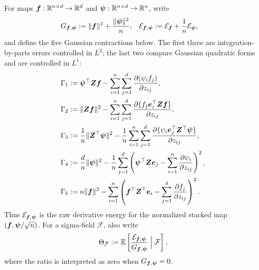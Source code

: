 \documentclass{article}
\theoremstyle{plain} %
\theoremstyle{definition} %
\theoremstyle{definition} %
\begin{document}
For maps $\boldsymbol{f}:{\mathbb{R}}^{n\times d}\to{\mathbb{R}}^d$ and
$\boldsymbol\psi:{\mathbb{R}}^{n\times d}\to{\mathbb{R}}^n$, write
\begin{align*}
    G_{\boldsymbol{f},\boldsymbol\psi}
    &:=\lVert\boldsymbol{f}\rVert^2+\frac{\lVert\boldsymbol\psi\rVert^2}{n},
    &
    {\mathcal E}_{\boldsymbol{f},\boldsymbol\psi}
    &:={\mathcal E}_{\boldsymbol{f}}+\frac1n{\mathcal E}_{\boldsymbol\psi},
\end{align*}
and define the five Gaussian contractions below. The first three are
integration-by-parts errors controlled in $L^2$; the last two compare
Gaussian quadratic forms and are controlled in $L^1$:
\begin{align*}
    \Gamma_1
    &:={}
       \boldsymbol\psi^\top\boldsymbol{Z}\boldsymbol{f}
       -\sum_{i=1}^n\sum_{j=1}^d
          \pdv{(\psi_i f_j)}{z_{ij}},\\
    \Gamma_2
    &:={}
       \lVert\boldsymbol{Z}\boldsymbol{f}\rVert^2
       -\sum_{i=1}^n\sum_{j=1}^d
          \pdv{\{f_j\boldsymbol{e}_i^\top\boldsymbol{Z}\boldsymbol{f}\}}{z_{ij}},\\
    \Gamma_3
    &:={}
       \frac1n\lVert\boldsymbol{Z}^\top\boldsymbol\psi\rVert^2
       -\frac1n\sum_{i=1}^n\sum_{j=1}^d
          \pdv{\{\psi_i\boldsymbol{e}_j^\top\boldsymbol{Z}^\top\boldsymbol\psi\}}{z_{ij}},\\
    \Gamma_4
    &:={}
       \frac dn\lVert\boldsymbol\psi\rVert^2
       -\frac1n\sum_{j=1}^d\left(
          \boldsymbol\psi^\top\boldsymbol{Z}\boldsymbol{e}_j
          -\sum_{i=1}^n\pdv{\psi_i}{z_{ij}}
       \right)^2,\\
    \Gamma_5
    &:={}
       n\lVert\boldsymbol{f}\rVert^2
       -\sum_{i=1}^n\left(
          \boldsymbol{f}^\top\boldsymbol{Z}^\top\boldsymbol{e}_i
          -\sum_{j=1}^d\pdv{f_j}{z_{ij}}
       \right)^2.
\end{align*}
Thus ${\mathcal E}_{\boldsymbol{f},\boldsymbol\psi}$ is the raw derivative energy for the
normalized stacked map $(\boldsymbol{f},\boldsymbol\psi/\sqrt n)$.
For a sigma-field $\mathcal F$, also write
\begin{align*}
    \Theta_{\mathcal F}
    :={\mathbb{E}}\left[
       \frac{{\mathcal E}_{\boldsymbol{f},\boldsymbol\psi}}
            {G_{\boldsymbol{f},\boldsymbol\psi}}
       \mathrel{\Big|}\mathcal F
    \right],
\end{align*}
where the ratio is interpreted as zero when
$G_{\boldsymbol{f},\boldsymbol\psi}=0$.
\end{document}

